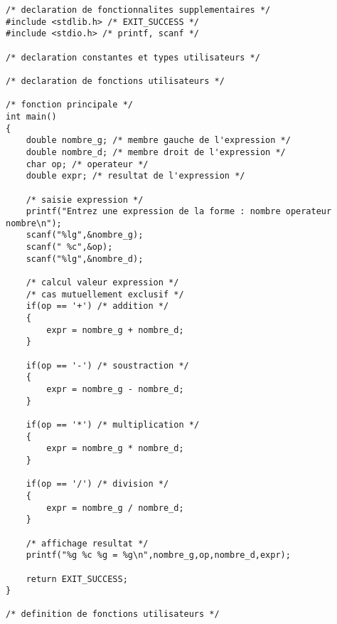 \begin{correction}
\begin{verbatim}
/* declaration de fonctionnalites supplementaires */
#include <stdlib.h> /* EXIT_SUCCESS */
#include <stdio.h> /* printf, scanf */

/* declaration constantes et types utilisateurs */

/* declaration de fonctions utilisateurs */

/* fonction principale */
int main()
{
    double nombre_g; /* membre gauche de l'expression */
    double nombre_d; /* membre droit de l'expression */
    char op; /* operateur */
    double expr; /* resultat de l'expression */

    /* saisie expression */
    printf("Entrez une expression de la forme : nombre operateur nombre\n");
    scanf("%lg",&nombre_g);
    scanf(" %c",&op);
    scanf("%lg",&nombre_d);

    /* calcul valeur expression */
    /* cas mutuellement exclusif */
    if(op == '+') /* addition */
    {
        expr = nombre_g + nombre_d;
    }

    if(op == '-') /* soustraction */
    {
        expr = nombre_g - nombre_d;
    }

    if(op == '*') /* multiplication */
    {
        expr = nombre_g * nombre_d;
    }

    if(op == '/') /* division */
    {
        expr = nombre_g / nombre_d;
    }

    /* affichage resultat */
    printf("%g %c %g = %g\n",nombre_g,op,nombre_d,expr);

    return EXIT_SUCCESS;
}

/* definition de fonctions utilisateurs */

\end{verbatim}
\end{correction}

